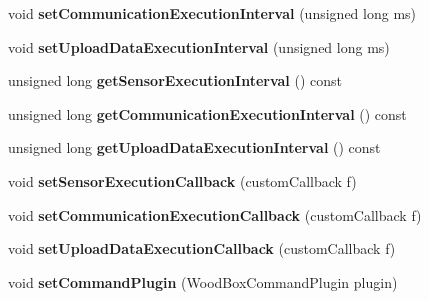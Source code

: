 \begin{DoxyCompactItemize}
void {\bfseries set\+Communication\+Execution\+Interval} (unsigned long ms)
\item 
\mbox{\label{classwood_box_1_1module_1_1_wood_box_module_ada9e2ee4b4da9396c504c0d0217d0c2f}} 
void {\bfseries set\+Upload\+Data\+Execution\+Interval} (unsigned long ms)
\item 
\mbox{\label{classwood_box_1_1module_1_1_wood_box_module_a4d5b8fd2ec5aeacb5704435bb6d961e7}} 
unsigned long {\bfseries get\+Sensor\+Execution\+Interval} () const
\item 
\mbox{\label{classwood_box_1_1module_1_1_wood_box_module_ad4a7b447a617d9c6908ef624cfd2cab4}} 
unsigned long {\bfseries get\+Communication\+Execution\+Interval} () const
\item 
\mbox{\label{classwood_box_1_1module_1_1_wood_box_module_a9582f3340d1aa35abfe278dec41f4313}} 
unsigned long {\bfseries get\+Upload\+Data\+Execution\+Interval} () const
\item 
\mbox{\label{classwood_box_1_1module_1_1_wood_box_module_a5841176b2161324d7e72045e69454c62}} 
void {\bfseries set\+Sensor\+Execution\+Callback} (custom\+Callback f)
\item 
\mbox{\label{classwood_box_1_1module_1_1_wood_box_module_adbdb8028cfb897d3323876be6d117db7}} 
void {\bfseries set\+Communication\+Execution\+Callback} (custom\+Callback f)
\item 
\mbox{\label{classwood_box_1_1module_1_1_wood_box_module_a4a428c0ed9491864d812df07467ab850}} 
void {\bfseries set\+Upload\+Data\+Execution\+Callback} (custom\+Callback f)
\item 
\mbox{\label{classwood_box_1_1module_1_1_wood_box_module_ad40df0835ac2ffcec83cfb96d12f9079}} 
void {\bfseries set\+Command\+Plugin} (Wood\+Box\+Command\+Plugin plugin)
\item 
\mbox{\label{classwood_box_1_1module_1_1_wood_box_module_a94cfcf71ecd1d715d14752001fbc7b6a}} 

\end{DoxyCompactItemize}
